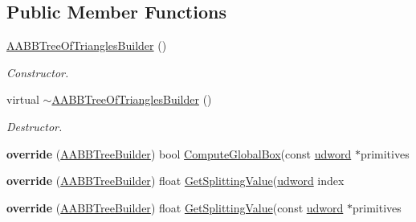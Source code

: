 \subsection*{Public Member Functions}
\begin{DoxyCompactItemize}
\item 
\hyperlink{classAABBTreeOfTrianglesBuilder_ade9a5c88862b3ac659cbc9060e794ba6}{A\+A\+B\+B\+Tree\+Of\+Triangles\+Builder} ()\hypertarget{classAABBTreeOfTrianglesBuilder_ade9a5c88862b3ac659cbc9060e794ba6}{}\label{classAABBTreeOfTrianglesBuilder_ade9a5c88862b3ac659cbc9060e794ba6}

\begin{DoxyCompactList}\small\item\em Constructor. \end{DoxyCompactList}\item 
virtual \hyperlink{classAABBTreeOfTrianglesBuilder_a33247c5452e9ea6d17f3e1721ce23980}{$\sim$\+A\+A\+B\+B\+Tree\+Of\+Triangles\+Builder} ()\hypertarget{classAABBTreeOfTrianglesBuilder_a33247c5452e9ea6d17f3e1721ce23980}{}\label{classAABBTreeOfTrianglesBuilder_a33247c5452e9ea6d17f3e1721ce23980}

\begin{DoxyCompactList}\small\item\em Destructor. \end{DoxyCompactList}\item 
{\bfseries override} (\hyperlink{classAABBTreeBuilder}{A\+A\+B\+B\+Tree\+Builder}) bool \hyperlink{classAABBTreeBuilder_adde85a9974ea5dc2c74fd851e11abf75}{Compute\+Global\+Box}(const \hyperlink{IceTypes_8h_a44c6f1920ba5551225fb534f9d1a1733}{udword} $\ast$primitives\hypertarget{classAABBTreeOfTrianglesBuilder_a2f6283c1e6984f911b174f782855382e}{}\label{classAABBTreeOfTrianglesBuilder_a2f6283c1e6984f911b174f782855382e}

\item 
{\bfseries override} (\hyperlink{classAABBTreeBuilder}{A\+A\+B\+B\+Tree\+Builder}) float \hyperlink{classAABBTreeBuilder_acf08d2d4275763e25585aa240e641be1}{Get\+Splitting\+Value}(\hyperlink{IceTypes_8h_a44c6f1920ba5551225fb534f9d1a1733}{udword} index\hypertarget{classAABBTreeOfTrianglesBuilder_a403388f4d1d770202e88be67d87040ed}{}\label{classAABBTreeOfTrianglesBuilder_a403388f4d1d770202e88be67d87040ed}

\item 
{\bfseries override} (\hyperlink{classAABBTreeBuilder}{A\+A\+B\+B\+Tree\+Builder}) float \hyperlink{classAABBTreeBuilder_acf08d2d4275763e25585aa240e641be1}{Get\+Splitting\+Value}(const \hyperlink{IceTypes_8h_a44c6f1920ba5551225fb534f9d1a1733}{udword} $\ast$primitives\hypertarget{classAABBTreeOfTrianglesBuilder_a8760cf1bd0076081e2ac58d0b07ade36}{}\label{classAABBTreeOfTrianglesBuilder_a8760cf1bd0076081e2ac58d0b07ade36}

\end{DoxyCompactItemize}

